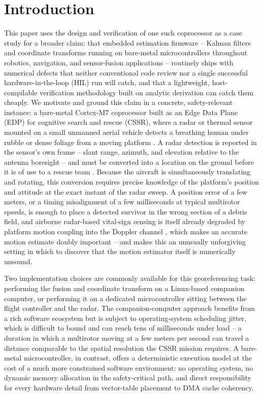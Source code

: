 \documentclass[conference]{IEEEtran}
\begin{document}
\section{Introduction}

This paper uses the design and verification of one such coprocessor as a case study for a broader claim: that embedded estimation firmware -- Kalman filters and coordinate transforms running on bare-metal microcontrollers throughout robotics, navigation, and sensor-fusion applications -- routinely ships with numerical defects that neither conventional code review nor a single successful hardware-in-the-loop (HIL) run will catch, and that a lightweight, host-compilable verification methodology built on analytic derivation can catch them cheaply. We motivate and ground this claim in a concrete, safety-relevant instance: a bare-metal Cortex-M7 coprocessor built as an Edge Data Plane (EDP) for cognitive search and rescue (CSSR), where a radar or thermal sensor mounted on a small unmanned aerial vehicle detects a breathing human under rubble or dense foliage from a moving platform \cite{r11,r12}. A radar detection is reported in the sensor's own frame -- slant range, azimuth, and elevation relative to the antenna boresight -- and must be converted into a location on the ground before it is of use to a rescue team \cite{r13}. Because the aircraft is simultaneously translating and rotating, this conversion requires precise knowledge of the platform's position and attitude at the exact instant of the radar sweep. A position error of a few meters, or a timing misalignment of a few milliseconds at typical multirotor speeds, is enough to place a detected survivor in the wrong section of a debris field, and airborne radar-based vital-sign sensing is itself already degraded by platform motion coupling into the Doppler channel \cite{r14}, which makes an accurate motion estimate doubly important -- and makes this an unusually unforgiving setting in which to discover that the motion estimator itself is numerically unsound.

Two implementation choices are commonly available for this georeferencing task: performing the fusion and coordinate transform on a Linux-based companion computer, or performing it on a dedicated microcontroller sitting between the flight controller and the radar. The companion-computer approach benefits from a rich software ecosystem but is subject to operating-system scheduling jitter, which is difficult to bound and can reach tens of milliseconds under load -- a duration in which a multirotor moving at a few meters per second can travel a distance comparable to the spatial resolution the CSSR mission requires. A bare-metal microcontroller, in contrast, offers a deterministic execution model at the cost of a much more constrained software environment: no operating system, no dynamic memory allocation in the safety-critical path, and direct responsibility for every hardware detail from vector-table placement to DMA cache coherency.
\end{document}
